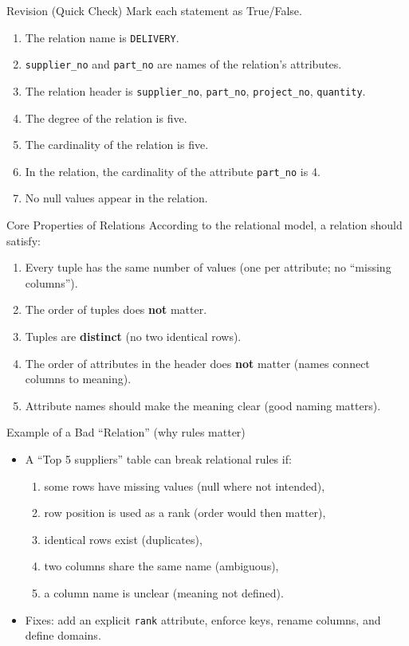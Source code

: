 \documentclass[10pt,aspectratio=169]{beamer}
\begin{document}
\begin{frame}{Revision (Quick Check)}
\small
Mark each statement as True/False.
\begin{enumerate}
  \item The relation name is \texttt{DELIVERY}.
  \item \texttt{supplier\_no} and \texttt{part\_no} are names of the relation's attributes.
  \item The relation header is \texttt{supplier\_no}, \texttt{part\_no}, \texttt{project\_no}, \texttt{quantity}.
  \item The degree of the relation is five.
  \item The cardinality of the relation is five.
  \item In the relation, the cardinality of the attribute \texttt{part\_no} is 4.
  \item No null values appear in the relation.
\end{enumerate}
\end{frame}

\begin{frame}{Core Properties of Relations}
\small
According to the relational model, a relation should satisfy:
\begin{enumerate}
  \item Every tuple has the same number of values (one per attribute; no ``missing columns'').
  \item The order of tuples does \textbf{not} matter.
  \item Tuples are \textbf{distinct} (no two identical rows).
  \item The order of attributes in the header does \textbf{not} matter (names connect columns to meaning).
  \item Attribute names should make the meaning clear (good naming matters).
\end{enumerate}
\end{frame}

\begin{frame}{Example of a Bad ``Relation'' (why rules matter)}
\small
\begin{itemize}
  \item A ``Top 5 suppliers'' table can break relational rules if:
  \begin{enumerate}\small
    \item some rows have missing values (null where not intended),
    \item row position is used as a rank (order would then matter),
    \item identical rows exist (duplicates),
    \item two columns share the same name (ambiguous),
    \item a column name is unclear (meaning not defined).
  \end{enumerate}
  \item Fixes: add an explicit \texttt{rank} attribute, enforce keys, rename columns, and define domains.
\end{itemize}
\end{frame}
\end{document}

